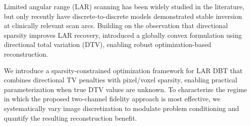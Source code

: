 \documentclass[journal, a4paper]{IEEEtran}
\begin{document}



Limited angular range (LAR) scanning has been widely studied in the literature, but only recently have discrete-to-discrete models demonstrated stable inversion at clinically relevant scan arcs. Building on the observation that directional sparsity improves LAR recovery, \cite{zhang2021directional} introduced a globally convex formulation using directional total variation (DTV), enabling robust optimization-based reconstruction.

We introduce a sparsity-constrained optimization framework for LAR DBT that combines directional TV penalties with pixel/voxel sparsity, enabling practical parameterization when true DTV values are unknown. To characterize the regime in which the proposed two-channel fidelity approach is most effective, we systematically vary image discretization to modulate problem conditioning and quantify the resulting reconstruction benefit.

\end{document}

